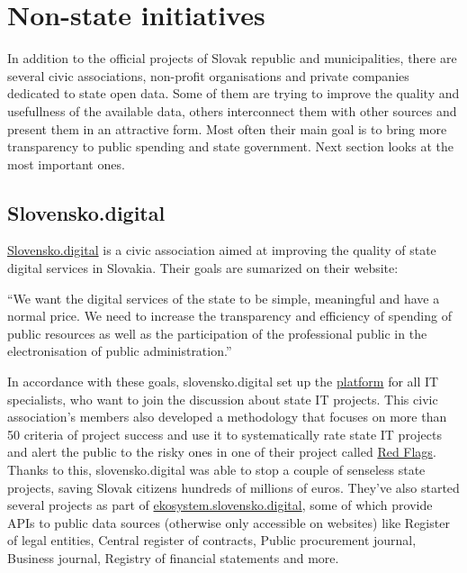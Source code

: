 \documentclass[thesis=B,english]{FITthesis}[2012/06/26]
\begin{document}
	\section{Non-state initiatives}
	\label{non-state-initiatives}
	In addition to the official projects of Slovak republic and municipalities, there are several civic associations, non-profit organisations and private companies dedicated to state open data. Some of them are trying to improve the quality and usefullness of the available data, others interconnect them with other sources and present them in an attractive form. Most often their main goal is to bring more transparency to public spending and state government. Next section looks at the most important ones.
	\subsection{Slovensko.digital}
	\label{slovensko.digital}
	\href{https://slovensko.digital}{Slovensko.digital} is a civic association aimed at improving the quality of state digital services in Slovakia. 
	Their goals are sumarized on their website:
	\begin{displayquote}
		``We want the digital services of the state to be simple, meaningful and have a normal price. We need to increase the transparency and efficiency of spending of public resources as well as the participation of the professional public in the electronisation of public administration.''
	\end{displayquote}
	In accordance with these goals, slovensko.digital set up the \href{https://platforma.slovensko.digital}{platform} for all IT specialists, who want to join the discussion about state IT projects. This civic association's members also developed a methodology that focuses on more than 50 criteria of project success and use it to systematically rate state IT projects and alert the public to the risky ones in one of their project called \href{https://redflags.slovensko.digital/}{Red Flags}. Thanks to this, slovensko.digital was able to stop a couple of senseless state projects, saving Slovak citizens hundreds of millions of euros. They've also started several projects as part of \href{https://ekosystem.slovensko.digital/}{ekosystem.slovensko.digital}, some of which provide APIs to public data sources (otherwise only accessible on websites) like Register of legal entities, Central register of contracts, Public procurement journal, Business journal, Registry of financial statements and more. 
\end{document}
